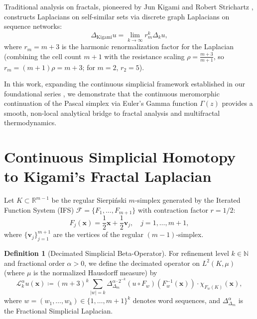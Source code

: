 \documentclass[11pt,a4paper]{article}
\theoremstyle{plain}
\theoremstyle{definition}
\newtheorem{definition}[theorem]{Definition}
\theoremstyle{remark}
\numberwithin{equation}{section}
\begin{document}
Traditional analysis on fractals, pioneered by Jun Kigami and Robert Strichartz \cite{kigami2001, strichartz2006}, constructs Laplacians on self-similar sets via discrete graph Laplacians on sequence networks:
\begin{equation}
\Delta_{\text{Kigami}} u = \lim_{k \to \infty} r_m^k \Delta_k u,
\end{equation}
where $r_m = m+3$ is the harmonic renormalization factor for the Laplacian (combining the cell count $m+1$ with the resistance scaling $\rho = \frac{m+3}{m+1}$, so $r_m = (m+1)\rho = m+3$; for $m=2$, $r_2 = 5$).

In this work, expanding the continuous simplicial framework established in our foundational series \cite{silvafilho2026simplex, silvafilho2026waves, silvafilho2026inter}, we demonstrate that the continuous meromorphic continuation of the Pascal simplex via Euler's Gamma function $\Gamma(z)$ provides a smooth, non-local analytical bridge to fractal analysis and multifractal thermodynamics.

\section{Continuous Simplicial Homotopy to Kigami's Fractal Laplacian}

Let $K \subset \mathbb{R}^{m-1}$ be the regular Sierpi\'nski $m$-simplex generated by the Iterated Function System (IFS) $\mathcal{F} = \{F_1, \dots, F_{m+1}\}$ with contraction factor $r = 1/2$:
\begin{equation}
F_j(\mathbf{x}) = \frac{1}{2}\mathbf{x} + \frac{1}{2}\mathbf{v}_j, \quad j=1,\dots,m+1,
\end{equation}
where $\{\mathbf{v}_j\}_{j=1}^{m+1}$ are the vertices of the regular $(m-1)$-simplex.

\begin{definition}[Decimated Simplicial Beta-Operator]
For refinement level $k \in \mathbb{N}$ and fractional order $\alpha > 0$, we define the decimated operator on $L^2(K, \mu)$ (where $\mu$ is the normalized Hausdorff measure) by
\begin{equation}
\label{eq:decimated_op}
\mathcal{L}_k^\alpha u(\mathbf{x}) \coloneqq (m+3)^k \sum_{|w|=k} \Delta_{\Delta_m}^{\alpha \cdot 2^{-k}} \left(u \circ F_w\right)\left(F_w^{-1}(\mathbf{x})\right) \cdot \chi_{F_w(K)}(\mathbf{x}),
\end{equation}
where $w = (w_1, \dots, w_k) \in \{1, \dots, m+1\}^k$ denotes word sequences, and $\Delta_{\Delta_m}^\alpha$ is the Fractional Simplicial Laplacian.
\end{definition}
\end{document}
